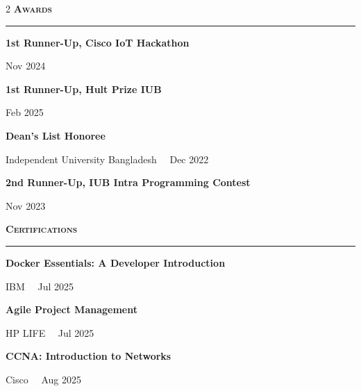\documentclass[a4paper,10pt]{article}
\newcommand{\dotsep}{\ \textperiodcentered\ }
\newcommand{\cvsection}[1]{%
  \vspace{7pt}%
  {\color{accent}\bfseries\scshape\large #1}\par
  \vspace{1pt}%
  \noindent\textcolor{hairline}{\rule{\linewidth}{0.7pt}}\par
  \vspace{4pt}}
\newcommand{\award}[2]{%
  {\small\bfseries #1}\par{\footnotesize\color{soft} #2}\par\vspace{3.5pt}}
\begin{document}
\begin{paracol}{2}
\cvsection{Awards}
\award{1st Runner-Up, Cisco IoT Hackathon}{Nov 2024}
\award{1st Runner-Up, Hult Prize IUB}{Feb 2025}
\award{Dean's List Honoree}{Independent University Bangladesh \dotsep Dec 2022}
\award{2nd Runner-Up, IUB Intra Programming Contest}{Nov 2023}

\cvsection{Certifications}
\award{Docker Essentials: A Developer Introduction}{IBM \dotsep Jul 2025}
\award{Agile Project Management}{HP LIFE \dotsep Jul 2025}
\award{CCNA: Introduction to Networks}{Cisco \dotsep Aug 2025}

\end{paracol}
\end{document}
